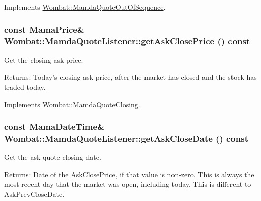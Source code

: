 Implements \hyperlink{classWombat_1_1MamdaQuoteOutOfSequence_12c5be28761ab6796c44466e06bbc37a}{Wombat::Mamda\-Quote\-Out\-Of\-Sequence}.\hypertarget{classWombat_1_1MamdaQuoteListener_1c6e2936fa8677578ee30e6a50ee29bf}{
\subsubsection[getAskClosePrice]{\setlength{\rightskip}{0pt plus 5cm}const Mama\-Price\& Wombat::Mamda\-Quote\-Listener::get\-Ask\-Close\-Price () const}}
\label{classWombat_1_1MamdaQuoteListener_1c6e2936fa8677578ee30e6a50ee29bf}


Get the closing ask price. 

\begin{Desc}
\item[Returns:]Today's closing ask price, after the market has closed and the stock has traded today. \end{Desc}


Implements \hyperlink{classWombat_1_1MamdaQuoteClosing_0db88ef67d6459e31b0568e9bbd44d59}{Wombat::Mamda\-Quote\-Closing}.\hypertarget{classWombat_1_1MamdaQuoteListener_3454bc5865c264f87778000ed9348f91}{
\subsubsection[getAskCloseDate]{\setlength{\rightskip}{0pt plus 5cm}const Mama\-Date\-Time\& Wombat::Mamda\-Quote\-Listener::get\-Ask\-Close\-Date () const}}
\label{classWombat_1_1MamdaQuoteListener_3454bc5865c264f87778000ed9348f91}


Get the ask quote closing date. 

\begin{Desc}
\item[Returns:]Date of the Ask\-Close\-Price, if that value is non-zero. This is always the most recent day that the market was open, including today. This is different to Ask\-Prev\-Close\-Date. \end{Desc}


